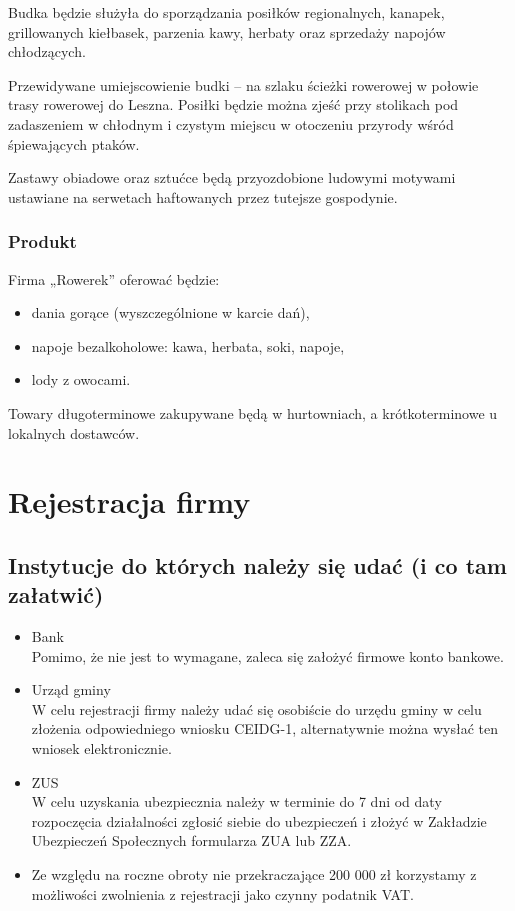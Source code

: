\documentclass{sprawozdanie-agh}
\begin{document}
		Budka będzie służyła do sporządzania posiłków regionalnych, kanapek, grillowanych kiełbasek, parzenia kawy, herbaty oraz sprzedaży napojów chłodzących.
		
		Przewidywane umiejscowienie budki – na szlaku ścieżki rowerowej w połowie trasy rowerowej do Leszna. Posiłki będzie można zjeść przy stolikach pod zadaszeniem w chłodnym i czystym miejscu w otoczeniu przyrody wśród śpiewających ptaków.
		
		Zastawy obiadowe oraz sztućce będą przyozdobione ludowymi motywami ustawiane na serwetach haftowanych przez tutejsze gospodynie.
		
		\subsubsection{Produkt}

		Firma „Rowerek” oferować będzie:
		\begin{itemize}
			\item dania gorące (wyszczególnione w karcie dań),
			\item napoje bezalkoholowe: kawa, herbata, soki, napoje,
			\item lody z owocami.
		\end{itemize}
		Towary długoterminowe zakupywane będą w hurtowniach, a krótkoterminowe u lokalnych dostawców.

	\section{Rejestracja firmy}

		\subsection{Instytucje do których należy się udać (i co tam załatwić)}
		
		\begin{itemize}
			\item Bank \\
			Pomimo, że nie jest to wymagane, zaleca się założyć firmowe konto bankowe.
			\item Urząd gminy \\
			W celu rejestracji firmy należy udać się osobiście do urzędu gminy w celu złożenia odpowiedniego wniosku CEIDG-1, alternatywnie można wysłać ten wniosek elektronicznie. 
			\item ZUS \\
			W celu uzyskania ubezpiecznia należy w terminie do 7 dni od daty rozpoczęcia działalności zgłosić siebie do ubezpieczeń i złożyć w Zakładzie Ubezpieczeń Społecznych formularza ZUA lub ZZA. 
			\item Ze względu na roczne obroty nie przekraczające 200 000 zł korzystamy z możliwości zwolnienia z rejestracji jako czynny podatnik VAT.
		\end{itemize}
		
\end{document}

